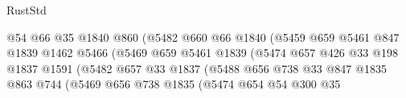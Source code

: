 \begin{lexlean}{RustStd}
\begin{coremodule}
                                          @54
                                          @66
                                          @35
                                          @1840
                                          @860
                                          (@5482
                                            @660
                                            @66
                                            @1840
                                            (@5459
                                              @659
                                              @5461
                                              @847
                                              @1839
                                              @1462
                                              @5466
                                              (@5469
                                                @659
                                                @5461
                                                @1839
                                                (@5474
                                                  @657
                                                  @426
                                                  @33
                                                  @198
                                                  @1837
                                                  @1591
                                                  (@5482
                                                    @657
                                                    @33
                                                    @1837
                                                    (@5488
                                                      @656
                                                      @738
                                                      @33
                                                      @847
                                                      @1835
                                                      @863
                                                      @744
                                                      (@5469
                                                        @656
                                                        @738
                                                        @1835
                                                        (@5474
                                                          @654
                                                          @54
                                                          @300
                                                          @35

\end{coremodule}
\end{lexlean}
